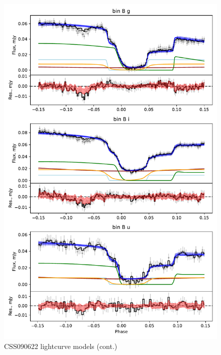 \begin{figure}
    \centering
    \includegraphics[width=\textwidth]{figures/results/CSS090622/CSS090622_2.pdf}
    \caption{CSS090622 lightcurve models (cont.)}
    \label{fig:CSS090622 all lightcurves cont 1}
\end{figure}



